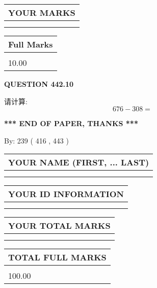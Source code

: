 \documentclass{ctexart}
\begin{document}
 
  
\vspace{0.2in}
  
\noindent\begin{tabular}{|l|}
\hline
 YOUR MARKS  \\
\hline
 \\ 
 \\ 
\hline
\end{tabular}
\hspace{0.05in} \begin{tabular}{|l|}
\hline
 Full Marks  \\
\hline
 \\ 
10.00 \\
\hline
\end{tabular}
{\textbf{\Large{QUESTION
442.10 
}}}
  
  
 
请计算:
\begin{equation}
676 -   %
308 = \nonumber
\end{equation}
 

 

 
   
   
 \vspace{0.2in}
 
   
   
   
   
\vspace{1.0in} 
{\textbf{\large{ *** END OF PAPER, THANKS *** }}} 
   
   
\hspace{1.0in} By: 
 239 ( 416 ,  443 )
   
   
   
   
\newpage 
\setcounter{page}{ 
   443001 } 
   
   
   
   
\noindent\begin{tabular}{|l|}
\hline
YOUR NAME (FIRST, ... LAST)  \\
\hline
 \\ 
 \\ 
\hline
\end{tabular}
\hspace{0.05in} \begin{tabular}{|l|}
\hline
 YOUR   ID   INFORMATION  \\
\hline
 \\ 
 \\ 
\hline
\end{tabular}
   
   
\vspace{0.2in}\noindent\begin{tabular}{|l|}
\hline
YOUR TOTAL MARKS  \\
\hline
 \\ 
 \\ 
\hline
\end{tabular}
\hspace{0.05in} \begin{tabular}{|l|}
\hline
TOTAL FULL MARKS  \\
\hline
 \\ 
100.00 \\
\hline
\end{tabular}
   
\end{document}
